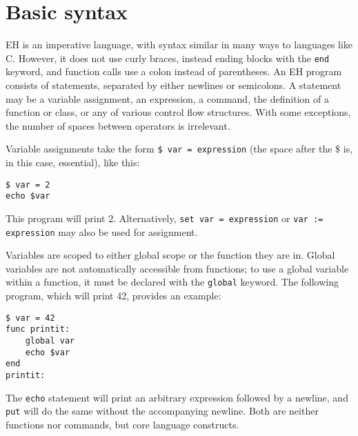 \documentclass{article}
\begin{document}
\section{Basic syntax}
EH is an imperative language, with syntax similar in many ways to languages like C. 
However, it does not use curly braces, instead ending blocks with the \verb#end# keyword, and function calls use a colon instead of parentheses. 
An EH program consists of statements, separated by either newlines or semicolons. 
A statement may be a variable assignment, an expression, a command, the definition of a function or class, or any of various control flow structures. 
With some exceptions, the number of spaces between operators is irrelevant.

Variable assignments take the form \verb#$ var = expression# (the space after the \$ is, in this case, essential), like this:
\begin{verbatim}
$ var = 2
echo $var
\end{verbatim}
This program will print 2. 
Alternatively, \verb#set var = expression# or \verb#var := expression# may also be used for assignment.

Variables are scoped to either global scope or the function they are in. 
Global variables are not automatically accessible from functions; to use a global variable within a function, it must be declared with the \verb#global# keyword. 
The following program, which will print 42, provides an example:
\begin{verbatim}
$ var = 42
func printit:
	global var
	echo $var
end
printit:
\end{verbatim}

The \verb#echo# statement will print an arbitrary expression followed by a newline, and \verb#put# will do the same without the accompanying newline. 
Both are neither functions nor commands, but core language constructs.
\end{document}
